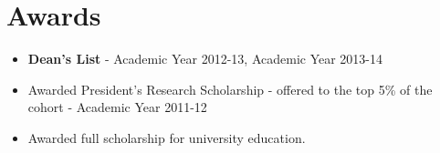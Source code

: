 \section{Awards}\label{awards}

\begin{itemize}
\tightlist
\item
  \textbf{Dean's List} - Academic Year 2012-13, Academic Year 2013-14
\item
  Awarded President's Research Scholarship - offered to the top 5\% of
  the cohort - Academic Year 2011-12
\item
  Awarded full scholarship for university education.
\end{itemize}
